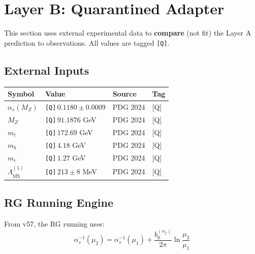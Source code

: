 \documentclass[11pt,a4paper]{article}
\newcommand{\Qnum}[1]{\textcolor{red!70!black}{\texttt{[Q]}}\,#1}
\theoremstyle{definition}
\begin{document}
\section{Layer B: Quarantined Adapter}
\label{sec:layer-b}

\begin{layerbbox}
This section uses external experimental data to \textbf{compare} (not fit)
the Layer A prediction to observations. All values are tagged \texttt{[Q]}.
\end{layerbbox}

\subsection{External Inputs}
\label{subsec:external-inputs}

\begin{quarantinebox}
\begin{center}
\begin{tabular}{llll}
\toprule
Symbol & Value & Source & Tag \\
\midrule
$\alpha_s(M_Z)$ & \Qnum{$0.1180 \pm 0.0009$} & PDG 2024 & [Q] \\
$M_Z$ & \Qnum{$91.1876$ GeV} & PDG 2024 & [Q] \\
$m_t$ & \Qnum{$172.69$ GeV} & PDG 2024 & [Q] \\
$m_b$ & \Qnum{$4.18$ GeV} & PDG 2024 & [Q] \\
$m_c$ & \Qnum{$1.27$ GeV} & PDG 2024 & [Q] \\
$\Lambda_{\overline{\text{MS}}}^{(5)}$ & \Qnum{$213 \pm 8$ MeV} & PDG 2024 & [Q] \\
\bottomrule
\end{tabular}
\end{center}
\end{quarantinebox}

\subsection{RG Running Engine}
\label{subsec:rg-engine}

From v57, the RG running uses:
\begin{equation}
\label{eq:rg-running}
\alpha_s^{-1}(\mu_2) = \alpha_s^{-1}(\mu_1) + \frac{b_0^{(n_f)}}{2\pi}\ln\frac{\mu_2}{\mu_1}
\end{equation}
\end{document}
